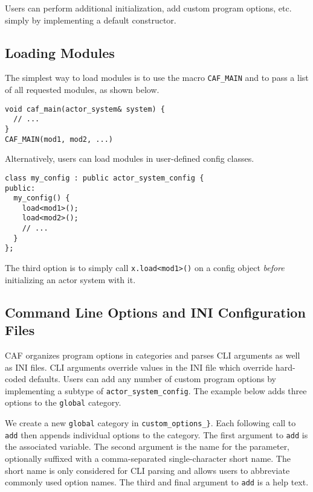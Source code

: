 Users can perform additional initialization, add custom program options, etc.
simply by implementing a default constructor.

\subsection{Loading Modules}
\label{system-config-module}

The simplest way to load modules is to use the macro \lstinline^CAF_MAIN^ and
to pass a list of all requested modules, as shown below.

\begin{lstlisting}
void caf_main(actor_system& system) {
  // ...
}
CAF_MAIN(mod1, mod2, ...)
\end{lstlisting}

Alternatively, users can load modules in user-defined config classes.

\begin{lstlisting}
class my_config : public actor_system_config {
public:
  my_config() {
    load<mod1>();
    load<mod2>();
    // ...
  }
};
\end{lstlisting}

The third option is to simply call \lstinline^x.load<mod1>()^ on a config
object \emph{before} initializing an actor system with it.

\subsection{Command Line Options and INI Configuration Files}
\label{system-config-options}

CAF organizes program options in categories and parses CLI arguments as well as
INI files. CLI arguments override values in the INI file which override
hard-coded defaults. Users can add any number of custom program options by
implementing a subtype of \lstinline^actor_system_config^. The example below
adds three options to the \lstinline^global^ category.


We create a new \lstinline^global^ category in  \lstinline^custom_options_}^.
Each following call to \lstinline^add^ then appends individual options to the
category. The first argument to \lstinline^add^ is the associated variable. The
second argument is the name for the parameter, optionally suffixed with a
comma-separated single-character short name. The short name is only considered
for CLI parsing and allows users to abbreviate commonly used option names. The
third and final argument to \lstinline^add^ is a help text.

